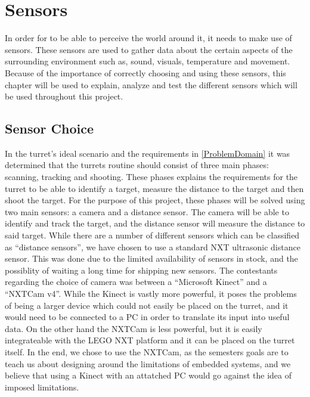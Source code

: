 \chapter{Sensors} \label{sensors}
In order for \name to be able to perceive the world around it, it needs to make
use of sensors. These sensors are used to gather data about the certain aspects
of the surrounding environment such as, sound, visuals, temperature and
movement. Because of the importance of correctly choosing and using these
sensors, this chapter will be used to explain, analyze and test the different
sensors which will be used throughout this project.

\section{Sensor Choice}\label{SensorChoice}
In the turret's ideal scenario and the requirements in
\autoref{ProblemDomain} it was determined that the turrets routine should
consist of three main phases: scanning, tracking and shooting. These phases explains the
requirements for the turret to be able to identify a target, measure the
distance to the target and then shoot the target. For the purpose of this
project, these phases will be solved using two main sensors: a camera and a
distance sensor. The camera will be able to identify and track the target, and
the distance sensor will measure the distance to said target. While there are a
number of different sensors which can be classified as ``distance sensors'', we
have chosen to use a standard NXT ultrasonic distance sensor. This was done due
to the limited availability of sensors in stock, and the possiblity of waiting a
long time for shipping new sensors. The contestants regarding the choice of
camera was between a ``Microsoft Kinect'' and a ``NXTCam v4''. While the Kinect
is vastly more powerful, it poses the problems of being a larger device which
could not easily be placed on the turret, and it would need to be connected to a
PC in order to translate its input into useful data. On the other hand the
NXTCam is less powerful, but it is easily integrateable with the LEGO NXT
platform and it can be placed on the turret itself. In the end, we chose to use
the NXTCam, as the semesters goals are to teach us about designing around the
limitations of embedded systems, and we believe that using a Kinect with an
attatched PC would go against the idea of imposed limitations.





% 
% 
% 
% 
